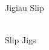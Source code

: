 \begin{multicols}{2}
    \Huge{Jigiau Slip}\\
    \vspace{1cm}\\
    \normalsize{
      \noindent 
      \blindtext
    }

    \newcolumn

    \Huge{Slip Jigs}\\
    \vspace{1cm}\\
    \normalsize{
      \noindent
      \blindtext
    }

    \end{multicols}
